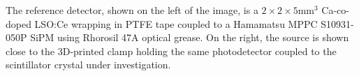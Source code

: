 \label{fig:actualsetup} The reference detector, shown on the left of the image, is a $2\times2\times5$mm$^3$ Ca-co-doped LSO:Ce wrapping in PTFE tape coupled to a Hamamatsu MPPC S10931-050P SiPM using Rhorosil 47A optical grease. On the right, the source is shown close to the 3D-printed clamp holding the same photodetector coupled to the scintillator crystal under investigation.
